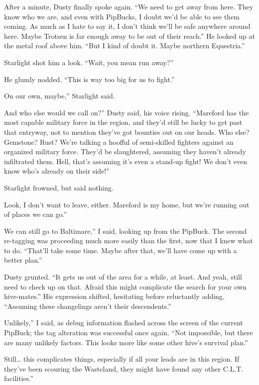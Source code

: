 After a minute, Dusty finally spoke again. “We need to get away from here. They know who we are, and even with PipBucks, I doubt we’d be able to see them coming. As much as I hate to say it, I don’t think we’ll be safe anywhere around here. Maybe Trotsen is far enough away to be out of their reach.” He looked up at the metal roof above him. “But I kind of doubt it. Maybe northern Equestria.”

Starlight shot him a look. “Wait, you mean run away?”

He glumly nodded. “This is way too big for us to fight.”

\leavevmode{}On our own, maybe,” Starlight said.

\leavevmode{}And who else would we call on?” Dusty said, his voice rising. “Mareford has the most capable military force in the region, and they’d still be lucky to get past that entryway, not to mention they’ve got bounties out on our heads. Who else? Gemstone? Rust? We’re talking a hoofful of semi-skilled fighters against an organized military force. They’d be slaughtered, assuming they haven’t already infiltrated them. Hell, that’s assuming it’s even a stand-up fight! We don’t even know who’s already on their side!”

Starlight frowned, but said nothing.

\leavevmode{}Look, I don’t want to leave, either. Mareford is my home, but we’re running out of places we can go.”

\leavevmode{}We can still go to Baltimare,” I said, looking up from the PipBuck. The second re-tagging was proceeding much more easily than the first, now that I knew what to do. “That’ll take some time. Maybe after that, we’ll have come up with a better plan.”

Dusty grunted. “It gets us out of the area for a while, at least. And yeah, still need to check up on that. Afraid this might complicate the search for your own hive-mates.” His expression shifted, hesitating before reluctantly adding, “Assuming these changelings aren’t their descendents.”

\leavevmode{}Unlikely,” I said, as debug information flashed across the screen of the current PipBuck; the tag alteration was successful once again. “Not impossible, but there are many unlikely factors. This looks more like some other hive’s survival plan.”

\leavevmode{}Still… this complicates things, especially if all your leads are in this region. If they’ve been scouring the Wasteland, they might have found any other C.L.T. facilities.”

